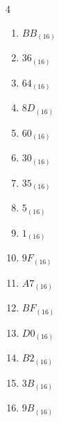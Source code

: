 \begin{multicols}{4}
\begin{enumerate}
  \item $BB_{(16)}$

        \phantom{$=187$}

\columnbreak %

  \item $36_{(16)}$

        \phantom{$=54$}

  \item $64_{(16)}$

        \phantom{$=100$}

  \item $8D_{(16)}$

        \phantom{$=141$}

  \item $60_{(16)}$

        \phantom{$=96$}

  \item $30_{(16)}$

        \phantom{$=48$}

  \item $35_{(16)}$

        \phantom{$=53$}

  \item $5_{(16)}$

        \phantom{$=5$}

  \item $1_{(16)}$

        \phantom{$=1$}

  \item $9F_{(16)}$

        \phantom{$=159$}

  \item $A7_{(16)}$

        \phantom{$=167$}

  \item $BF_{(16)}$

        \phantom{$=191$}

  \item $D0_{(16)}$

        \phantom{$=208$}

  \item $B2_{(16)}$

        \phantom{$=178$}

  \item $3B_{(16)}$

        \phantom{$=59$}

  \item $9B_{(16)}$


\end{enumerate}
\end{multicols}
